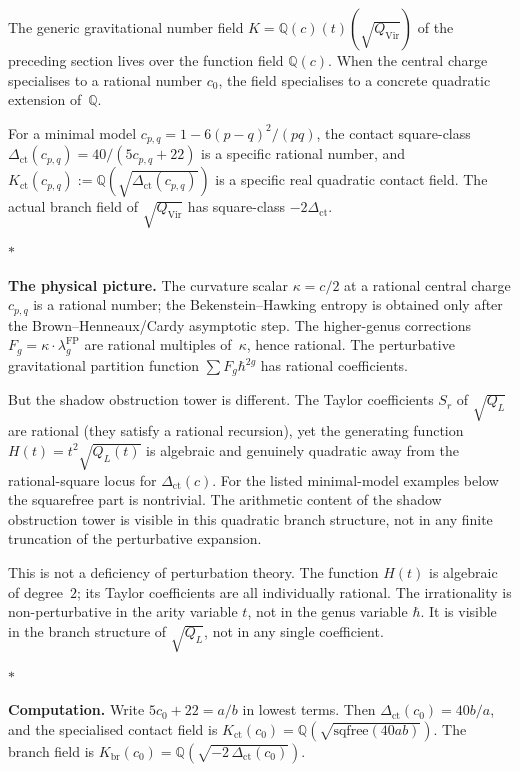 \documentclass[11pt]{article}
\newcommand{\Q}{\mathbb{Q}}
\newcommand{\sep}{\bigskip\begin{center}$*$\end{center}\medskip}
\begin{document}
The generic gravitational number field
$K = \Q(c)(t)(\sqrt{Q_{\mathrm{Vir}}})$ of the preceding
section lives over the function field $\Q(c)$.  When the
central charge specialises to a rational number $c_0$, the
field specialises to a concrete quadratic extension of~$\Q$.

For a minimal model $c_{p,q} = 1 - 6(p-q)^2/(pq)$,
the contact square-class
$\Delta_{\mathrm{ct}}(c_{p,q}) = 40/(5c_{p,q} + 22)$ is a
specific rational number, and
$K_{\mathrm{ct}}(c_{p,q}) := \Q(\sqrt{\Delta_{\mathrm{ct}}(c_{p,q})})$
is a specific real quadratic contact field.  The actual branch
field of $\sqrt{Q_{\mathrm{Vir}}}$ has square-class
$-2\Delta_{\mathrm{ct}}$.

\sep

\noindent\textbf{The physical picture.}\enspace
The curvature scalar $\kappa = c/2$ at a rational
central charge $c_{p,q}$ is a rational number; the
Bekenstein--Hawking entropy is obtained only after the
Brown--Henneaux/Cardy asymptotic step.  The
higher-genus corrections $F_g = \kappa \cdot \lambda_g^{\mathrm{FP}}$
are rational multiples of~$\kappa$, hence rational.  The
perturbative gravitational partition function
$\sum F_g \hbar^{2g}$ has rational coefficients.

But the shadow obstruction tower is different.  The Taylor coefficients
$S_r$ of $\sqrt{Q_L}$ are rational (they satisfy a rational
recursion), yet the generating function $H(t) = t^2\sqrt{Q_L(t)}$
is algebraic and genuinely quadratic away from the rational-square
locus for $\Delta_{\mathrm{ct}}(c)$.  For the listed minimal-model examples below
the squarefree part is nontrivial.  The arithmetic content of the
shadow obstruction tower is visible in this quadratic branch
structure, not in any finite truncation of the perturbative
expansion.

This is not a deficiency of perturbation theory.  The function
$H(t)$ is algebraic of degree~$2$; its Taylor coefficients are
all individually rational.  The irrationality is non-perturbative
in the arity variable $t$, not in the genus variable $\hbar$.
It is visible in the branch structure of $\sqrt{Q_L}$, not in
any single coefficient.

\sep

\noindent\textbf{Computation.}\enspace
Write $5c_0 + 22 = a/b$ in lowest terms.  Then
$\Delta_{\mathrm{ct}}(c_0) = 40b/a$, and the specialised contact
field is $K_{\mathrm{ct}}(c_0) =
\Q(\sqrt{\mathrm{sqfree}(40ab)})$.  The branch field is
$K_{\mathrm{br}}(c_0)=\Q(\sqrt{-2\,\Delta_{\mathrm{ct}}(c_0)})$.
\end{document}
